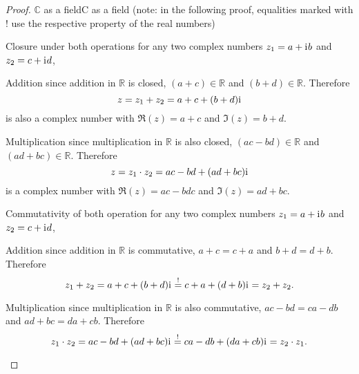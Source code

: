 \begin{proof}{$\bm{\mathbb{C}}$ as a field}{C as a field}
	(note: in the following proof, equalities marked with $!$ use the respective property of the real numbers)

	\begin{descitemize}
		\item[Closure under both operations] for any two complex numbers $z_{1}=a+\mathrm{i}\mkern1mu b$ and $z_{2}=c+\mathrm{i}\mkern1mu d$,
			\begin{listitemize}
			\item[Addition] since addition in $\mathbb{R}$ is closed, $(a+c)\in\mathbb{R}$ and $(b+d)\in\mathbb{R}$. Therefore
				\[
					z = z_{1}+z_{2} = a+c + (b+d)\mathrm{i}\mkern1mu
				\]
				is also a complex number with $\Re(z)=a+c$ and $\Im(z)=b+d$.
			\item[Multiplication] since multiplication in $\mathbb{R}$ is also closed, $(ac-bd)\in\mathbb{R}$ and $(ad+bc)\in\mathbb{R}$. Therefore
				\[
					z = z_{1} \cdot z_{2} = ac-bd + (ad+bc)\mathrm{i}\mkern1mu
				\]
				is a complex number with $\Re(z)=ac-bdc$ and $\Im(z)=ad+bc$.
			\end{listitemize}
		
		\item[Commutativity of both operation] for any two complex numbers $z_{1}=a+\mathrm{i}\mkern1mu b$ and $z_{2}=c+\mathrm{i}\mkern1mu d$,
			\begin{listitemize}
			\item[Addition] since addition in $\mathbb{R}$ is commutative, $a+c=c+a$ and $b+d=d+b$. Therefore
				\[
					z_{1} + z_{2} = a+c + (b+d)\mathrm{i}\mkern1mu \overset{!}{=} c+a + (d+b)\mathrm{i}\mkern1mu = z_{2}+z_{2}.
				\]
			\item[Multiplication] since multiplication in $\mathbb{R}$ is also commutative, $ac-bd = ca-db$ and $ad+bc=da+cb$. Therefore
				\[
					z_{1} \cdot z_{2} = ac-bd + (ad+bc)\mathrm{i}\mkern1mu \overset{!}{=} ca-db + (da+cb)\mathrm{i}\mkern1mu = z_{2} \cdot z_{1}.
				\]
			\end{listitemize}
		

\end{descitemize}
\end{proof}

